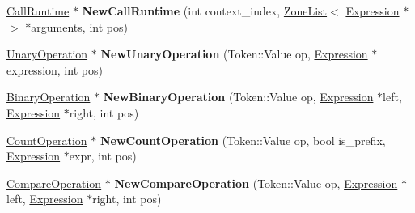 \begin{DoxyCompactItemize}
\item 
\hyperlink{classv8_1_1internal_1_1_call_runtime}{Call\+Runtime} $\ast$ {\bfseries New\+Call\+Runtime} (int context\+\_\+index, \hyperlink{classv8_1_1internal_1_1_zone_list}{Zone\+List}$<$ \hyperlink{classv8_1_1internal_1_1_expression}{Expression} $\ast$ $>$ $\ast$arguments, int pos)\hypertarget{classv8_1_1internal_1_1_b_a_s_e___e_m_b_e_d_d_e_d_a5affd53ab72cae88ac083b98f989fd2e}{}\label{classv8_1_1internal_1_1_b_a_s_e___e_m_b_e_d_d_e_d_a5affd53ab72cae88ac083b98f989fd2e}

\item 
\hyperlink{classv8_1_1internal_1_1_unary_operation}{Unary\+Operation} $\ast$ {\bfseries New\+Unary\+Operation} (Token\+::\+Value op, \hyperlink{classv8_1_1internal_1_1_expression}{Expression} $\ast$expression, int pos)\hypertarget{classv8_1_1internal_1_1_b_a_s_e___e_m_b_e_d_d_e_d_a37a7d2b6a478c349911bf3e4019a5f69}{}\label{classv8_1_1internal_1_1_b_a_s_e___e_m_b_e_d_d_e_d_a37a7d2b6a478c349911bf3e4019a5f69}

\item 
\hyperlink{classv8_1_1internal_1_1_binary_operation}{Binary\+Operation} $\ast$ {\bfseries New\+Binary\+Operation} (Token\+::\+Value op, \hyperlink{classv8_1_1internal_1_1_expression}{Expression} $\ast$left, \hyperlink{classv8_1_1internal_1_1_expression}{Expression} $\ast$right, int pos)\hypertarget{classv8_1_1internal_1_1_b_a_s_e___e_m_b_e_d_d_e_d_aec9791208fd263d1dd370ec0d7617357}{}\label{classv8_1_1internal_1_1_b_a_s_e___e_m_b_e_d_d_e_d_aec9791208fd263d1dd370ec0d7617357}

\item 
\hyperlink{classv8_1_1internal_1_1_count_operation}{Count\+Operation} $\ast$ {\bfseries New\+Count\+Operation} (Token\+::\+Value op, bool is\+\_\+prefix, \hyperlink{classv8_1_1internal_1_1_expression}{Expression} $\ast$expr, int pos)\hypertarget{classv8_1_1internal_1_1_b_a_s_e___e_m_b_e_d_d_e_d_a7ad8a8dde4fe02cc58b64a19b3d2202d}{}\label{classv8_1_1internal_1_1_b_a_s_e___e_m_b_e_d_d_e_d_a7ad8a8dde4fe02cc58b64a19b3d2202d}

\item 
\hyperlink{classv8_1_1internal_1_1_compare_operation}{Compare\+Operation} $\ast$ {\bfseries New\+Compare\+Operation} (Token\+::\+Value op, \hyperlink{classv8_1_1internal_1_1_expression}{Expression} $\ast$left, \hyperlink{classv8_1_1internal_1_1_expression}{Expression} $\ast$right, int pos)\hypertarget{classv8_1_1internal_1_1_b_a_s_e___e_m_b_e_d_d_e_d_ab0bae1c9948feec207677cb030f31cb0}{}\label{classv8_1_1internal_1_1_b_a_s_e___e_m_b_e_d_d_e_d_ab0bae1c9948feec207677cb030f31cb0}


\end{DoxyCompactItemize}
